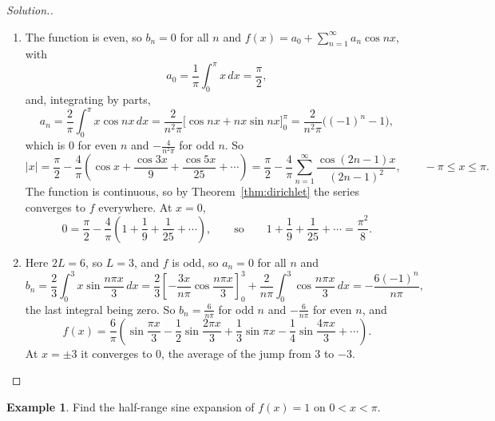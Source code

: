 \documentclass[11pt,a4paper]{article}
\theoremstyle{definition}
\newtheorem{exa}[thm]{Example}
\newenvironment{solution}
  {\renewcommand{\qedsymbol}{}\begin{proof}[\textit{Solution}.]}
  {\end{proof}}
\begin{document}
\begin{solution}
\begin{enumerate}
\item

\begin{figure}[H]
\centering
{}
\end{figure}

The function is even, so $b_n = 0$ for all $n$ and $f(x) = a_0 +
\sum^{\infty}_{n=1}a_n \cos n x$, with
\[a_0 = \frac{1}{\pi} \int^{\pi}_0 x\,dx = \frac{\pi}{2} ,\]
and, integrating by parts,
\[a_n = \frac{2}{\pi}\int^{\pi}_0 x \cos n x\,dx = \frac{2}{n^2\pi}\Big[\cos nx +
nx\sin nx \Big]^{\pi}_0 = \frac{2}{n^2\pi}\big((-1)^n-1\big),\]
which is $0$ for even $n$ and $-\frac{4}{n^2\pi}$ for odd $n$. So
\[|x| = \frac{\pi}{2} - \frac{4}{\pi}\left(\cos x + \frac{\cos 3x}{9} +
\frac{\cos 5x}{25}+ \cdots\right) = \frac{\pi}{2} -
\frac{4}{\pi}\sum_{n=1}^\infty\frac{\cos (2n-1)x}{(2n-1)^2},\qquad -\pi\leq
x\leq\pi .\]
The function is continuous, so by Theorem~\ref{thm:dirichlet} the series
converges to $f$ everywhere. At $x = 0$,
\[0 = \frac{\pi}{2} - \frac{4}{\pi}\left(1 + \frac{1}{9}+ \frac{1}{25}+
\cdots\right),\qquad\text{so}\qquad 1 + \frac{1}{9}+ \frac{1}{25}+ \cdots =
\frac{\pi^2}{8} .\]

\item Here $2L = 6$, so $L = 3$, and $f$ is odd, so $a_n = 0$ for all $n$ and
\[b_n = \frac{2}{3}\int^3_0x \sin \frac{n\pi x}{3}\,dx = \frac{2}{3}\left[-\frac{3
x}{n\pi}\cos \frac{n\pi x}{3}\right]_0^3 + \frac{2}{n\pi}\int^3_0 \cos \frac{n\pi
x}{3}\,dx = -\frac{6(-1)^n}{n\pi} ,\]
the last integral being zero. So $b_n = \frac{6}{n\pi}$ for odd $n$ and
$-\frac{6}{n\pi}$ for even $n$, and
\[f(x) = \frac{6}{\pi}\left(\sin\frac{\pi x}{3} - \frac{1}{2}\sin\frac{2\pi x}{3}
+ \frac{1}{3}\sin\pi x - \frac{1}{4}\sin\frac{4\pi x}{3} + \cdots\right) .\]
At $x = \pm 3$ it converges to $0$, the average of the jump from $3$ to $-3$.
\end{enumerate}
\end{solution}

\begin{exa}
\label{ex:halfrange}
Find the half-range sine expansion of $f(x) = 1$ on $0<x<\pi$.
\end{exa}
\end{document}
